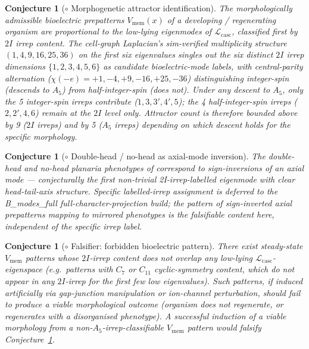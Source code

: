 \documentclass[12pt]{article}
\newtheorem{conjecture}[theorem]{Conjecture}
\newcommand{\Lcasc}{\mathcal{L}_{\mathrm{casc}}}
\begin{document}
\begin{conjecture}[$\circ$ Morphogenetic attractor identification]\label{conj:C1}
The morphologically admissible bioelectric prepatterns
$V_{\mathrm{mem}}(x)$ of a developing / regenerating organism are
proportional to the low-lying eigenmodes of $\Lcasc$, classified
first by $2I$ irrep content. The cell-graph Laplacian's
sim-verified multiplicity structure $(1, 4, 9, 16, 25, 36)$ on
the first six eigenvalues singles out the six distinct $2I$ irrep
dimensions $\{1, 2, 3, 4, 5, 6\}$ as candidate bioelectric-mode
labels, with central-parity alternation
($\chi(-e) = +1, -4, +9, -16, +25, -36$) distinguishing
integer-spin (descends to $A_5$) from half-integer-spin
(does not). Under any descent to $A_5$, only the 5
integer-spin irreps contribute ($1, 3, 3', 4', 5$); the 4
half-integer-spin irreps ($2, 2', 4, 6$) remain at the $2I$
level only. Attractor count is therefore bounded above by 9
($2I$ irreps) and by 5 ($A_5$ irreps) depending on which
descent holds for the specific morphology.
\end{conjecture}

\begin{conjecture}[$\circ$ Double-head / no-head as axial-mode inversion]\label{conj:C2}
The double-head and no-head planaria phenotypes of
\cite{LevinBeane2011,DurantLevin2017} correspond to
\emph{sign-inversions} of an axial mode — conjecturally the
first non-trivial 2I-irrep-labelled eigenmode with clear
head-tail-axis structure. Specific labelled-irrep assignment
is deferred to the B\_modes\_full full-character-projection
build; the pattern of sign-inverted axial prepatterns mapping
to mirrored phenotypes is the falsifiable content here,
independent of the specific irrep label.
\end{conjecture}

\begin{conjecture}[$\circ$ Falsifier: forbidden bioelectric pattern]\label{conj:C3}
There exist steady-state $V_{\mathrm{mem}}$ patterns whose
$2I$-irrep content does not overlap any low-lying
$\Lcasc$-eigenspace (e.g.\ patterns with $C_7$ or $C_{11}$
cyclic-symmetry content, which do not appear in any $2I$-irrep
for the first few low eigenvalues).
Such patterns, if induced artificially via gap-junction
manipulation or ion-channel perturbation, should fail to produce
a viable morphological outcome (organism does not regenerate, or
regenerates with a disorganised phenotype). A successful
induction of a viable morphology from a
non-$A_5$-irrep-classifiable $V_{\mathrm{mem}}$ pattern would
falsify Conjecture~\ref{conj:C1}.
\end{conjecture}
\end{document}
